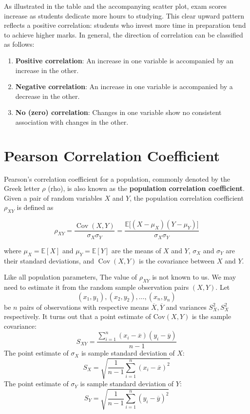 \documentclass[twoside]{book}
\begin{document}
As illustrated in the table and the accompanying scatter plot, exam scores increase as students dedicate more hours to studying. This clear upward pattern reflects a positive correlation: students who invest more time in preparation tend to achieve higher marks.  In general, the direction of correlation can be classified as follows:

\begin{enumerate}
	\item \textbf{Positive correlation}: An increase in one variable is accompanied by an increase in the other.
	\item \textbf{Negative correlation}: An increase in one variable is accompanied by a decrease in the other.
	\item \textbf{No (zero) correlation}: Changes in one variable show no consistent association with changes in the other.
\end{enumerate}


\section{Pearson Correlation Coefficient}

Pearson's correlation coefficient for a population, commonly denoted by the Greek letter \(\rho\) (rho), is also known as the \textbf{population correlation coefficient}. Given a pair of random variables \(X\) and \(Y\), the population correlation coefficient \(\rho_{XY}\) is defined as

\begin{textbox}
\[
\rho_{XY} = \frac{\operatorname{Cov}(X,Y)}{\sigma_X \sigma_Y} = \frac{\mathbb{E}\big[(X - \mu_X)(Y - \mu_Y)\big]}{\sigma_X \sigma_Y}
\]
\end{textbox}
where \(\mu_X = \mathbb{E}[X]\) and \(\mu_Y = \mathbb{E}[Y]\) are the means of \(X\) and \(Y\), \(\sigma_X\) and \(\sigma_Y\) are their standard deviations, and \(\operatorname{Cov}(X,Y)\) is the covariance between \(X\) and \(Y\).

Like all population parameters, The value of $\rho_{XY}$ is not known to us. We may need to estimate it from the random sample observation pairs $(X,Y)$. Let $$ (x_1, y_1), (x_2, y_2), \dots,(x_n, y_n) $$ be $n$ pairs of observations with respective means $\overline{X}, \overline{Y}$ and variances $S_X^2, S_X^2$ respectively. It turns out that a point estimate of $\text{Cov}(X,Y)$ is the sample covariance:
$$ S_{XY} = \dfrac{\sum_{i=1}^{n} (x_i - \overline{x})(y_i - \overline{y})}{n-1} $$
The point estimate of $\sigma_X$ is sample standard deviation of $X$:
$$S_X = \sqrt{\dfrac{1}{n - 1} \sum_{i=1}^{n} (x_i - \overline{x})^2}$$
The point estimate of $\sigma_Y$ is sample standard deviation of $Y$:
$$S_Y = \sqrt{\dfrac{1}{n - 1} \sum_{i=1}^{n} (y_i - \overline{y})^2}$$
\end{document}
